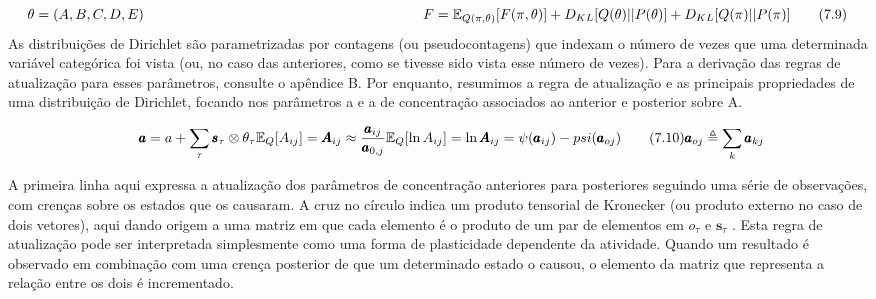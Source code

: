 \documentclass[
  12pt,
]{book}
\begin{document}
\[\begin{equation} 
\theta = (A, B, C,D,E) \qquad\qquad\qquad\qquad\qquad\qquad\qquad\qquad\qquad\qquad\quad\\ 
F=\mathbb E_{Q(\pi,\theta)}[F(\pi,\theta)]+D_{KL}[Q(\theta)||P(\theta)]+D_{KL}[Q(\pi)||P(\pi)] 
\end{equation} \qquad (7.9)\]
As distribuições de Dirichlet são parametrizadas por contagens (ou pseudocontagens) que indexam o número de vezes que uma determinada variável categórica foi vista (ou, no caso das anteriores, como se tivesse sido vista esse número de vezes). Para a derivação das regras de atualização para esses parâmetros, consulte o apêndice B. Por enquanto, resumimos a regra de atualização e as principais propriedades de uma distribuição de Dirichlet, focando nos parâmetros a e a de concentração associados ao anterior e posterior sobre A.

\[ \begin{equation} \qquad
\pmb{a} = a + \sum_{\tau}\pmb{s}_\tau \otimes\theta_\tau \\
\mathbb E_Q[A_{ij}]=\pmb{A}_{ij} \approx \frac{\pmb{a}_{ij}}{\pmb{a}_{0,j}} \qquad\\
\mathbb E_Q[\ln A_{ij}]= \ln \pmb{A}_{ij}=\psi(\pmb{a}_{ij})-psi(\pmb{a}_{oj})  \qquad (7.10) \\
\pmb{a}_{oj} \triangleq \sum_k \pmb{a}_{kj}
\end{equation}
\]

A primeira linha aqui expressa a atualização dos parâmetros de concentração anteriores para posteriores seguindo uma série de observações, com crenças sobre os estados que os causaram. A cruz no círculo indica um produto tensorial de Kronecker (ou produto externo no caso de dois vetores), aqui dando origem a uma matriz em que cada elemento é o produto de um par de elementos em \(o_\tau\) e \(\pmb{s}_\tau\) . Esta regra de atualização pode ser interpretada simplesmente como uma forma de plasticidade dependente da atividade. Quando um resultado é observado em combinação com uma crença posterior de que um determinado estado o causou, o elemento da matriz que representa a relação entre os dois é incrementado.
\end{document}
